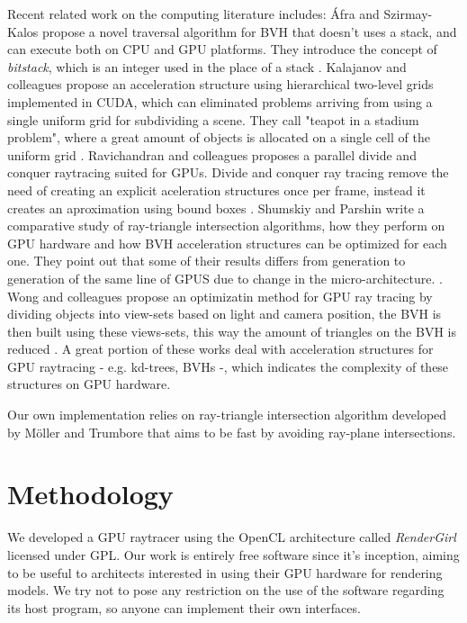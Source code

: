 \documentclass[a4paper]{sbgames}               %
\begin{document}
Recent related work on the computing literature includes: Áfra and
Szirmay-Kalos propose a novel traversal algorithm for BVH that doesn't
uses a stack, and can execute both on CPU and GPU platforms. They
introduce the concept of \emph{bitstack}, which is an integer used in
the place of a stack \cite{Afra}. Kalajanov and colleagues propose an
acceleration structure using hierarchical two-level grids implemented
in CUDA, which can eliminated problems arriving from using a single
uniform grid for subdividing a scene. They call "teapot in a stadium
problem", where a great amount of objects is allocated on a single
cell of the uniform grid \cite{Kalojanov}. Ravichandran and colleagues
proposes a parallel divide and conquer raytracing suited for
GPUs. Divide and conquer ray tracing remove the need of creating an
explicit aceleration structures once per frame, instead it creates an
aproximation using bound boxes \cite{Ravichandran}. Shumskiy and
Parshin write a comparative study of ray-triangle intersection
algorithms, how they perform on GPU hardware and how BVH acceleration
structures can be optimized for each one. They point out that some of
their results differs from generation to generation of the same line
of GPUS due to change in the micro-architecture.
\cite{Shumskiy}. Wong and colleagues propose an optimizatin method for
GPU ray tracing by dividing objects into view-sets based on light and
camera position, the BVH is then built using these views-sets, this
way the amount of triangles on the BVH is reduced \cite{Wong}. A great
portion of these works deal with acceleration structures for GPU
raytracing - e.g. kd-trees, BVHs -, which indicates the complexity of
these structures on GPU hardware.

Our own implementation relies on ray-triangle intersection algorithm
developed by Möller and Trumbore that aims to be fast by avoiding
ray-plane intersections\cite{moller}.

\section{Methodology}
\label{sec:methodology}

We developed a GPU raytracer using the OpenCL architecture called
\emph{RenderGirl} licensed under GPL. Our work is entirely free
software since it's inception, aiming to be useful to architects
interested in using their GPU hardware for rendering models. We try not
to pose any restriction on the use of the software regarding its host
program, so anyone can implement their own interfaces.
\end{document}
